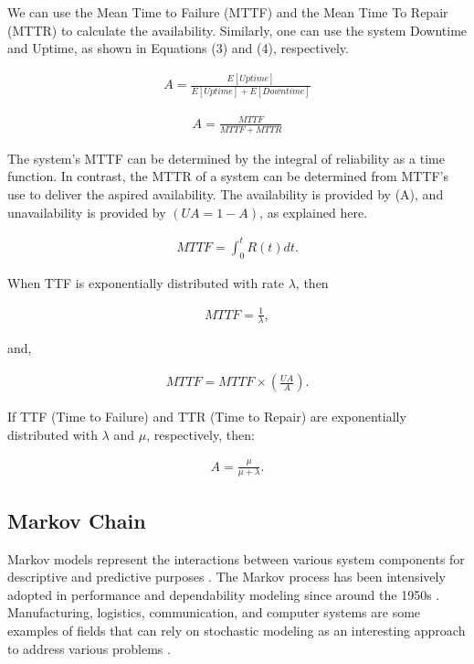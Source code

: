 \documentclass[conference]{IEEEtran}
\begin{document}
We can use the Mean Time to Failure (MTTF) and the Mean Time To Repair (MTTR) to calculate the availability. Similarly, one can use the system Downtime and Uptime, as shown in Equations (3) and (4), respectively.

\begin{align}
A = \frac{E[Uptime]}{E[Uptime] + E[Downtime]}
\end{align}

\begin{align}
A = \frac{MTTF}{MTTF + MTTR}
\end{align}

The system's MTTF can be determined by the integral of reliability as a time function. In contrast, the MTTR of a system can be determined from MTTF's use to deliver the aspired availability. The availability is provided by (A), and unavailability is provided by $(UA= 1-A)$, as explained here.

\begin{align}
MTTF = \int_{0}^{t} R(t)dt.
\end{align}

When TTF is exponentially distributed with rate $\lambda$, then

\begin{align}
MTTF = \frac{1}{\lambda},
\end{align}

and,

\begin{align}
MTTF = MTTF \times (\frac{UA}{A}).
\end{align}

If TTF (Time to Failure) and TTR (Time to Repair) are exponentially distributed with $\lambda$ and $\mu$, respectively, then:

\begin{align}
A = \frac{\mu}{\mu + \lambda}.
\end{align}

\subsection{Markov Chain}

Markov models represent the interactions between various system components for descriptive and predictive purposes \citep{daniel2004performance}. The Markov process has been intensively adopted in performance and dependability modeling since around the 1950s \citep{maciel2012dependability}. Manufacturing, logistics, communication, and computer systems are some examples of fields that can rely on stochastic modeling as an interesting approach to address various problems \citep{maciel2021survey}.
\end{document}

